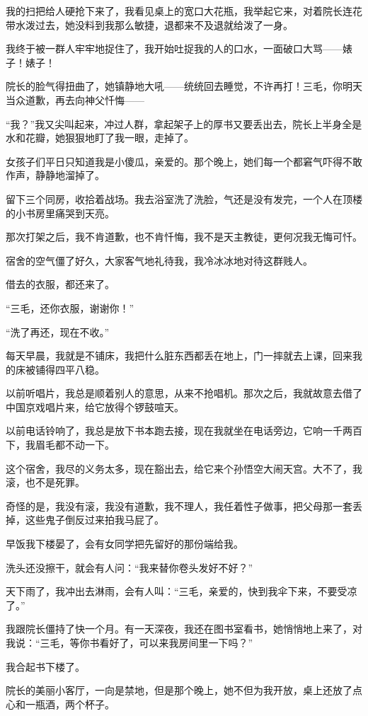 \par 我的扫把给人硬抢下来了，我看见桌上的宽口大花瓶，我举起它来，对着院长连花带水泼过去，她没料到我那么敏捷，退都来不及退就给泼了一身。
\par 我终于被一群人牢牢地捉住了，我开始吐捉我的人的口水，一面破口大骂——婊子！婊子！
\par 院长的脸气得扭曲了，她镇静地大吼——统统回去睡觉，不许再打！三毛，你明天当众道歉，再去向神父忏悔——
\par “我？”我又尖叫起来，冲过人群，拿起架子上的厚书又要丢出去，院长上半身全是水和花瓣，她狠狠地盯了我一眼，走掉了。
\par 女孩子们平日只知道我是小傻瓜，亲爱的。那个晚上，她们每一个都窘气吓得不敢作声，静静地溜掉了。
\par 留下三个同房，收拾着战场。我去浴室洗了洗脸，气还是没有发完，一个人在顶楼的小书房里痛哭到天亮。
\par 那次打架之后，我不肯道歉，也不肯忏悔，我不是天主教徒，更何况我无悔可忏。
\par 宿舍的空气僵了好久，大家客气地礼待我，我冷冰冰地对待这群贱人。
\par 借去的衣服，都还来了。
\par “三毛，还你衣服，谢谢你！”
\par “洗了再还，现在不收。”
\par 每天早晨，我就是不铺床，我把什么脏东西都丢在地上，门一摔就去上课，回来我的床被铺得四平八稳。
\par 以前听唱片，我总是顺着别人的意思，从来不抢唱机。那次之后，我就故意去借了中国京戏唱片来，给它放得个锣鼓喧天。
\par 以前电话铃响了，我总是放下书本跑去接，现在我就坐在电话旁边，它响一千两百下，我眉毛都不动一下。
\par 这个宿舍，我尽的义务太多，现在豁出去，给它来个孙悟空大闹天宫。大不了，我滚，也不是死罪。
\par 奇怪的是，我没有滚，我没有道歉，我不理人，我任着性子做事，把父母那一套丢掉，这些鬼子倒反过来拍我马屁了。
\par 早饭我下楼晏了，会有女同学把先留好的那份端给我。
\par 洗头还没擦干，就会有人问：“我来替你卷头发好不好？”
\par 天下雨了，我冲出去淋雨，会有人叫：“三毛，亲爱的，快到我伞下来，不要受凉了。”
\par 我跟院长僵持了快一个月。有一天深夜，我还在图书室看书，她悄悄地上来了，对我说：“三毛，等你书看好了，可以来我房间里一下吗？”
\par 我合起书下楼了。
\par 院长的美丽小客厅，一向是禁地，但是那个晚上，她不但为我开放，桌上还放了点心和一瓶酒，两个杯子。
